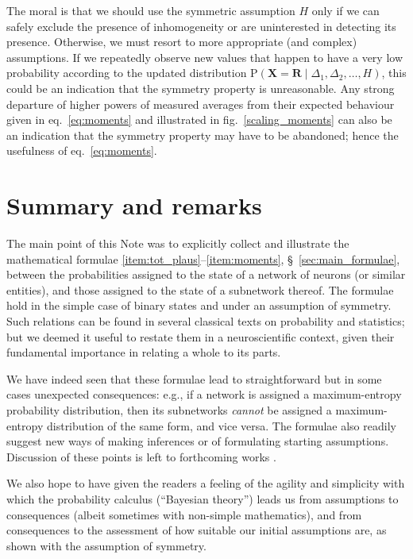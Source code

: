 \documentclass{article}
\newcommand*{\citep}{\parencites}
\def\arxivp{}
\def\mparcp{}
\def\philscip{}
\def\biorxivp{}
\theoremstyle{innote}
\newcommand*{\yX}{\bm{X}}%
\newcommand*{\yR}{\bm{R}}%
\newcommand*{\yH}{\varEta}
\newcommand*{\yD}{\varDelta}
\newcommand*{\eg}{{e.g.}}
\newcommand*{\cond}%
{\mathpunct{|}}%
\newcommand*{\p}{\mathrm{P}}%
\renewcommand*{\|}{\cond}
\newcommand*{\+}{\lor}
\newcommand*{\sect}{\S}%
\newcommand*{\eqn}{eq.}%
\newcommand*{\fig}{fig.}%
\let\varEta H
\begin{document}
The moral is that we should use the symmetric assumption $\yH$ only if we
can safely exclude the presence of inhomogeneity or are uninterested in
detecting its presence. Otherwise, we must resort to more appropriate (and
complex) assumptions. If we repeatedly observe new values that happen to
have a very low probability according to the updated distribution
$\p(\yX = \yR \cond \yD_1,\yD_2,\dotsc, \yH)$, this could be an indication
that the symmetry property is unreasonable. Any strong departure of higher
powers of measured averages from their expected behaviour given in
\eqn~\eqref{eq:moments} and illustrated in \fig~\ref{scaling_moments} can
also be an indication that the symmetry property may have to be abandoned;
hence the usefulness of \eqn~\eqref{eq:moments}.





\section{Summary and remarks}
\label{sec:summary}

The main point of this Note was to explicitly collect and illustrate the
mathematical formulae \ref{item:tot_plaus}--\ref{item:moments},
\sect~\ref{sec:main_formulae}, between the probabilities assigned to the
state of a network of neurons (or similar entities), and those assigned to
the state of a subnetwork thereof. The formulae hold in the simple case of
binary states and under an assumption of symmetry. Such relations can be
found in several classical texts on probability and statistics; but we
deemed it useful to restate them in a neuroscientific context, given their
fundamental importance in relating a whole to its parts.

We have indeed seen that these formulae lead to straightforward but in some
cases unexpected consequences: \eg, if a network is assigned a
maximum-entropy probability distribution, then its subnetworks
\emph{cannot} be assigned a maximum-entropy distribution of the same form,
and vice versa. The formulae also readily suggest new ways of making
inferences or of formulating starting assumptions. Discussion of these points
is left to forthcoming works \citep{rostamietal2016,rostamietal2016b}.

We also hope to have given the readers a feeling of the agility and
simplicity with which the probability calculus (\enquote{Bayesian theory})
leads us from assumptions to consequences (albeit sometimes with non-simple
mathematics), and from consequences to the assessment of how suitable our
initial assumptions are, as shown with the assumption of symmetry.





\defbibnote{postnote}{\small\par\medskip\noindent{\footnotesize%
\arxivp \mparcp \philscip \biorxivp}%
}

\newcommand{\citein}[2][]{\textnormal{\textcite[#1]{#2}}%
}
\newcommand{\citebi}[2][]{ref.\ \citep[#1]{#2}%
}
\newcommand{\subtitleproc}[1]{}

\printbibliography[postnote=postnote]
\end{document}
